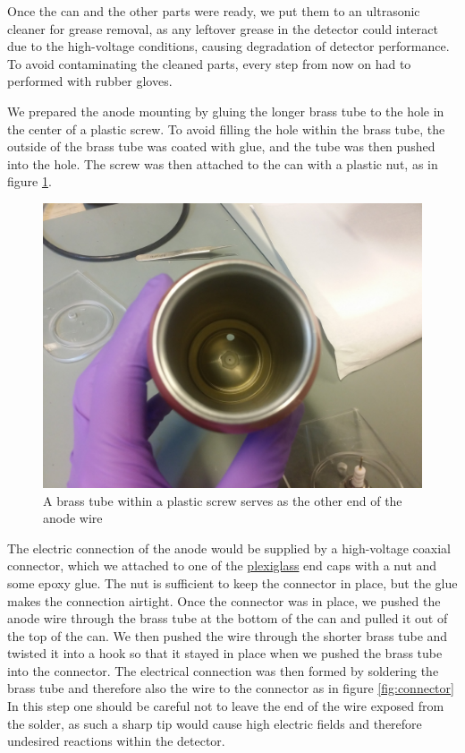 \documentclass[a4paper]{article}
\begin{document}
Once the can and the other parts were ready, we put them to an ultrasonic cleaner for grease removal, as any leftover grease in the detector could interact due to the high-voltage conditions, causing degradation of detector performance.
To avoid contaminating the cleaned parts, every step from now on had to performed with rubber gloves.

We prepared the anode mounting by gluing the longer brass tube 
to the hole in the center of a plastic screw.
To avoid filling the hole within the brass tube, the outside of the brass tube was coated with glue, and the tube was then pushed into the hole.
The screw was then attached to the can with a plastic nut, as in figure \ref{fig:anode_mounting}.

\begin{figure}[ht!]
\centering
\includegraphics[width=\textwidth]{fig/IMG_20201123_103327.jpg}
\caption{A brass tube within a plastic screw serves as the other end of the anode wire}
\label{fig:anode_mounting}
\end{figure}

The electric connection of the anode would be supplied by a high-voltage coaxial connector, which we attached to one of the
\href{https://en.wikipedia.org/wiki/Poly(methyl_methacrylate)}{plexiglass}
end caps with a nut and some epoxy glue.
The nut is sufficient to keep the connector in place, but the glue makes the connection airtight.
Once the connector was in place, we pushed the anode wire through the brass tube at the bottom of the can and pulled it out of the top of the can.
We then pushed the wire through the shorter brass tube and twisted it into a hook so that it stayed in place when we pushed the brass tube into the connector.
The electrical connection was then formed by soldering the brass tube and therefore also the wire to the connector as in figure \ref{fig:connector}
In this step one should be careful not to leave the end of the wire exposed from the solder, as such a sharp tip would cause high electric fields and therefore undesired reactions within the detector.
\end{document}
